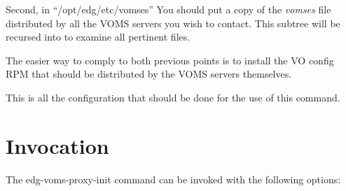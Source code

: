 \documentclass[a4paper]{book}
\begin{document}
Second, in ``/opt/edg/etc/vomses'' You should put a copy of the
\emph{vomses} file distributed by all the VOMS servers you wish to
contact.  This subtree will be recursed into to examine all pertinent
files.

The easier way to comply to both previous points is to install the VO
config RPM that should be distributed by the VOMS servers themselves.

This is all the configuration that should be done for the use of this
command.

\section{Invocation}

The edg-voms-proxy-init command can be invoked with the following
options: 
\end{document}
